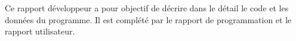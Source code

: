 \documentclass{themeensg}
\begin{document}
Ce rapport développeur a pour objectif de décrire dans le détail le code et les données du programme. Il est complété par le rapport de programmation et le rapport utilisateur.\\








\newpage
\listoffigures

\end{document}
